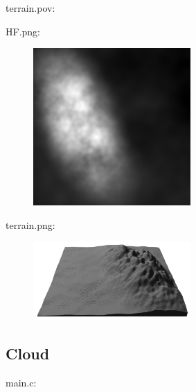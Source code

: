 terrain.pov:\\
\begin{scriptsize}
\begin{ttfamily}

\end{ttfamily}
\end{scriptsize}

HF.png:\\
\begin{center}
\begin{figure}[H]
\centering\includegraphics[width=6cm]{./HF.png}\\
\end{figure}
\end{center}

terrain.png:\\
\begin{center}
\begin{figure}[H]
\centering\includegraphics[width=6cm]{./terrain.png}\\
\end{figure}
\end{center}

\subsection{Cloud}

main.c:\\
\begin{scriptsize}
\begin{ttfamily}

\end{ttfamily}
\end{scriptsize}


